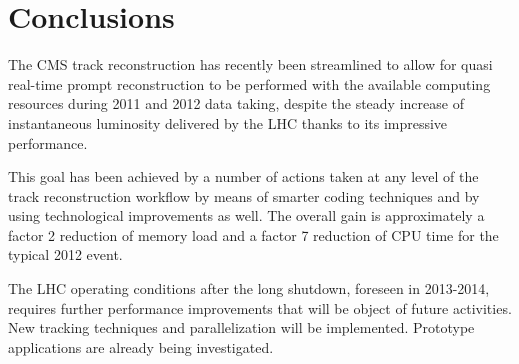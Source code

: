 \section{Conclusions}
\label{conclusions}

The CMS track reconstruction has recently been streamlined to allow
for quasi real-time prompt reconstruction to be performed with the
available computing resources during 2011 and 2012 data taking,
despite the steady increase of instantaneous luminosity delivered by
the LHC thanks to its impressive performance.

This goal has been achieved by a number of actions taken at any level
of the track reconstruction workflow by means of smarter coding
techniques and by using technological improvements as well. The
overall gain is approximately a factor 2 
reduction of memory load and a factor 7 reduction of CPU time for the
typical 2012 event.

The LHC operating conditions after the long shutdown, foreseen in
2013-2014, requires further performance improvements that will be
object of future activities. New tracking techniques and
parallelization will be implemented. Prototype applications are
already being investigated.
